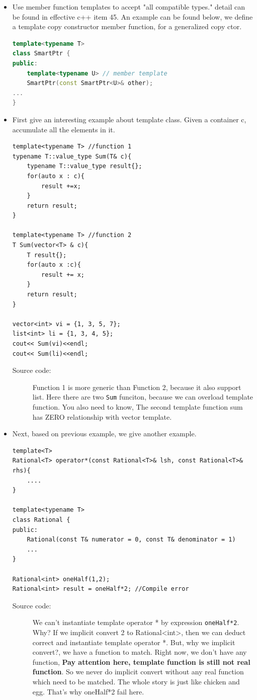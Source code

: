 \documentclass[a4paper,11pt,twoside]{book}
\begin{document}
\begin{itemize}
	\item Use member function templates to accept
	"all compatible types." detail can be found in effective c++ item 45. An example can be found below, we define a template copy constructor member function, for a generalized copy ctor.
	
\begin{lstlisting}[frame=single, language=c++]
template<typename T>
class SmartPtr {
public:
	template<typename U> // member template
	SmartPtr(const SmartPtr<U>& other); 
...
}
\end{lstlisting}
	
	\item First give an interesting example about template class. Given a container c, accumulate all the elements in it.
\begin{lstlisting}
template<typename T> //function 1
typename T::value_type Sum(T& c){
	typename T::value_type result{};
	for(auto x : c){
		result +=x;
	}
	return result;
}

template<typename T> //function 2
T Sum(vector<T> & c){
	T result{};
	for(auto x :c){
		result += x;
	}
	return result;
}

vector<int> vi = {1, 3, 5, 7};
list<int> li = {1, 3, 4, 5};
cout<< Sum(vi)<<endl;
cout<< Sum(li)<<endl;
\end{lstlisting}
\begin{description}
	\item[Source code:] Function 1 is more generic than Function 2, because it also support list. Here there are two \texttt{Sum} funciton, because we can overload template function. You also need to know, The second template function sum has ZERO relationship with vector template.
\end{description}

	\item Next, based on previous example, we give another example.
\begin{lstlisting}
template<T>
Rational<T> operator*(const Rational<T>& lsh, const Rational<T>& rhs){
	....
}

template<typename T>
class Rational {
public:
	Rational(const T& numerator = 0, const T& denominator = 1)
	...
} 

Rational<int> oneHalf(1,2);
Rational<int> result = oneHalf*2; //Compile error
\end{lstlisting}
\begin{description}
	\item[Source code:] We can't instantiate template operator * by expression \texttt{oneHalf*2}. Why? If we implicit convert 2 to Rational<int>, then we can deduct correct and instantiate template operator *. But, why we implicit convert?, we have a function to match. Right now, we don't have any function, \textbf{Pay attention here, template function is still not real function}. So we never do implicit convert without any real function which need to be matched.  The whole story is just like chicken and egg. That's why oneHalf*2 fail here. 
\end{description}


\end{itemize}
\end{document}
